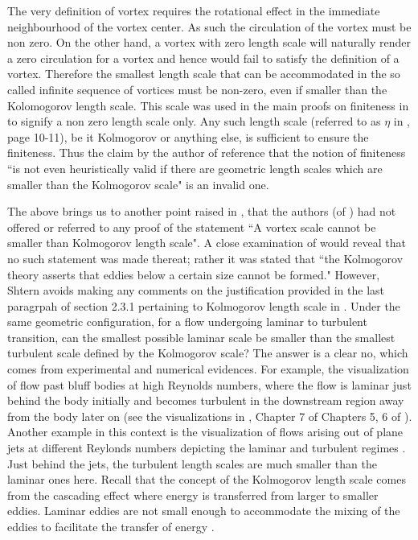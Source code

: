The very definition of vortex requires \cite{hal} the rotational effect in the immediate neighbourhood of the vortex center. As such the circulation \cite{white,batch} of the vortex must be non zero. On the other hand, a vortex with zero length scale will naturally render a zero circulation for a vortex and hence would fail to satisfy the definition of a vortex. Therefore the smallest length scale that can be accommodated in the so called infinite sequence of vortices must be non-zero, even if smaller than the Kolomogorov length scale. This scale was used in the main proofs on finiteness in \cite{kal18} to signify a non zero length scale only. Any such length scale (referred to as $\eta$ in \cite{kal18}, page 10-11), be it Kolmogorov or anything else, is sufficient to ensure the finiteness.  Thus the claim by the author of reference \cite{sh18} that the notion of finiteness ``is not even heuristically valid if there are geometric length scales which are smaller than the Kolmogorov scale" is an invalid one. 

The above brings us to another point raised in \cite{sh18}, that the authors (of \cite{kal18}) had not offered or referred to any proof of the statement ``A vortex scale cannot be smaller than Kolmogorov length scale". A close examination of \cite{kal18} would reveal that no such statement was made thereat; rather it was stated that ``the Kolmogorov theory \cite{wal} asserts that eddies below a certain size cannot be formed." However, Shtern \cite{sh18} avoids making any comments on the justification provided in the last paragrpah of section 2.3.1  pertaining to Kolmogorov length scale in \cite{kal18}. Under the same geometric configuration, for a flow undergoing laminar to turbulent transition, can the smallest possible laminar scale  be smaller than the smallest turbulent scale defined by the Kolmogorov scale? The answer is a clear no, which comes from experimental and numerical evidences. For example, the visualization of flow past bluff bodies at high Reynolds numbers, where the flow is laminar just behind the body initially and becomes turbulent in the downstream region away from the body  later on (see the visualizations  in \cite{dyke,zad1,zad2}, Chapter 7 of \cite{white} Chapters 5, 6 of \cite{white1}). Another example in this context is the visualization of flows arising out of plane jets at different Reylonds numbers depicting the laminar and turbulent  regimes \cite{sur,tenn}. Just behind the jets, the turbulent length scales are much smaller than the laminar ones here. Recall that the concept of the Kolmogorov length scale comes from the cascading effect where energy is transferred from larger to smaller eddies. Laminar eddies are not small enough to accommodate the mixing of the eddies to facilitate the transfer of energy \cite{white1}.  


